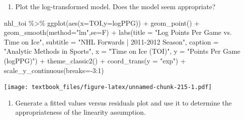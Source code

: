 \documentclass[
  11pt,
]{book}
\newenvironment{Shaded}{\begin{snugshade}}{\end{snugshade}}
\newcommand{\AttributeTok}[1]{\textcolor[rgb]{0.77,0.63,0.00}{#1}}
\newcommand{\DecValTok}[1]{\textcolor[rgb]{0.00,0.00,0.81}{#1}}
\newcommand{\FunctionTok}[1]{\textcolor[rgb]{0.00,0.00,0.00}{#1}}
\newcommand{\NormalTok}[1]{#1}
\newcommand{\SpecialCharTok}[1]{\textcolor[rgb]{0.00,0.00,0.00}{#1}}
\newcommand{\StringTok}[1]{\textcolor[rgb]{0.31,0.60,0.02}{#1}}
\providecommand{\tightlist}{%
  \setlength{\itemsep}{0pt}\setlength{\parskip}{0pt}}
\theoremstyle{definition}
\theoremstyle{definition}
\theoremstyle{definition}
\theoremstyle{definition}
\theoremstyle{remark}
\begin{document}
\newpage

\begin{enumerate}
\def\labelenumi{(\alph{enumi})}
\setcounter{enumi}{5}
\tightlist
\item
  Plot the log-transformed model. Does the model seem appropriate?
\end{enumerate}

\begin{Shaded}
\begin{Highlighting}[]
\NormalTok{nhl\_toi }\SpecialCharTok{\%\textgreater{}\%} \FunctionTok{ggplot}\NormalTok{(}\FunctionTok{aes}\NormalTok{(}\AttributeTok{x=}\NormalTok{TOI,}\AttributeTok{y=}\NormalTok{logPPG)) }\SpecialCharTok{+}
  \FunctionTok{geom\_point}\NormalTok{() }\SpecialCharTok{+}
  \FunctionTok{geom\_smooth}\NormalTok{(}\AttributeTok{method=}\StringTok{"lm"}\NormalTok{,}\AttributeTok{se=}\NormalTok{F) }\SpecialCharTok{+} 
  \FunctionTok{labs}\NormalTok{(}\AttributeTok{title =} \StringTok{"Log Points Per Game vs. Time on Ice"}\NormalTok{,}
       \AttributeTok{subtitle =} \StringTok{"NHL Forwards | 2011{-}2012 Season"}\NormalTok{,}
       \AttributeTok{caption =} \StringTok{"Analytic Methods in Sports"}\NormalTok{, }
       \AttributeTok{x =} \StringTok{"Time on Ice (TOI)"}\NormalTok{,}
       \AttributeTok{y =} \StringTok{"Points Per Game (logPPG)"}\NormalTok{) }\SpecialCharTok{+}
  \FunctionTok{theme\_classic2}\NormalTok{() }\SpecialCharTok{+}
  \FunctionTok{coord\_trans}\NormalTok{(}\AttributeTok{y =} \StringTok{"exp"}\NormalTok{)  }\SpecialCharTok{+}
  \FunctionTok{scale\_y\_continuous}\NormalTok{(}\AttributeTok{breaks=}\SpecialCharTok{{-}}\DecValTok{3}\SpecialCharTok{:}\DecValTok{1}\NormalTok{)}
\end{Highlighting}
\end{Shaded}

\texttt{[image: textbook\_files/figure-latex/unnamed-chunk-215-1.pdf]}

\newpage

\begin{enumerate}
\def\labelenumi{(\alph{enumi})}
\setcounter{enumi}{6}
\tightlist
\item
  Generate a fitted values versus residuals plot and use it to determine the appropriateness of the linearity assumption.
\end{enumerate}
\end{document}
